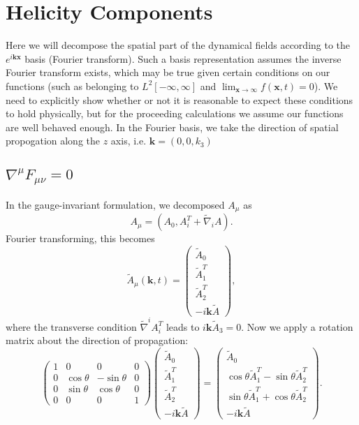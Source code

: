 \documentclass[10pt,letterpaper]{article}
\numberwithin{equation}{subsection}
\begin{document}
\section{Helicity Components}
Here we will decompose the spatial part of the dynamical fields according to the $e^{i\mathbf k \mathbf x}$ basis (Fourier transform). Such a basis representation assumes the inverse Fourier transform exists, which may be true given certain conditions on our functions (such as belonging to $L^2[-\infty,\infty]$ and $\lim_{\mathbf x\to\infty}f(\mathbf x,t) = 0$). We need to explicitly show whether or not it is reasonable to expect these conditions to hold physically, but for the proceeding calculations we assume our functions are well behaved enough. In the Fourier basis, we take the direction of spatial propogation along the $z$ axis, i.e. $\mathbf k = (0,0,k_3)$
\subsection{$\nabla^\mu F_{\mu\nu} = 0$}
In the gauge-invariant formulation, we decomposed $A_{\mu}$ as
\begin{equation}
A_\mu = (A_0, A_i^T + \tilde\nabla_i A).
\end{equation}
Fourier transforming, this becomes
\begin{equation}
\tilde A_{\mu}(\mathbf k,t) = 
\begin{pmatrix}
\tilde A_0 \\ \tilde A^T_1 \\ \tilde A^T_2 \\ -i \mathbf k \tilde A
\end{pmatrix},
\end{equation}
where the transverse condition $\tilde\nabla^i  A_i^T$ leads to $i \mathbf k \tilde A_3 = 0$. Now we apply a rotation matrix about the direction of propagation:
\begin{equation}
\begin{pmatrix}
1&0&0&0\\
0&\cos\theta&-\sin\theta&0\\
0&\sin\theta&\cos\theta&0\\
0&0&0&1
\end{pmatrix}
\begin{pmatrix}
\tilde A_0 \\ \tilde A^T_1 \\ \tilde A^T_2 \\ -i \mathbf k \tilde A
\end{pmatrix}
=
\begin{pmatrix}
\tilde A_0 \\ \cos\theta \tilde A^T_1 -\sin\theta \tilde A^T_2\\ \sin\theta \tilde A_1^T +\cos\theta \tilde A^T_2 \\ -i \mathbf k \tilde A
\end{pmatrix}.
\end{equation}
\end{document}
